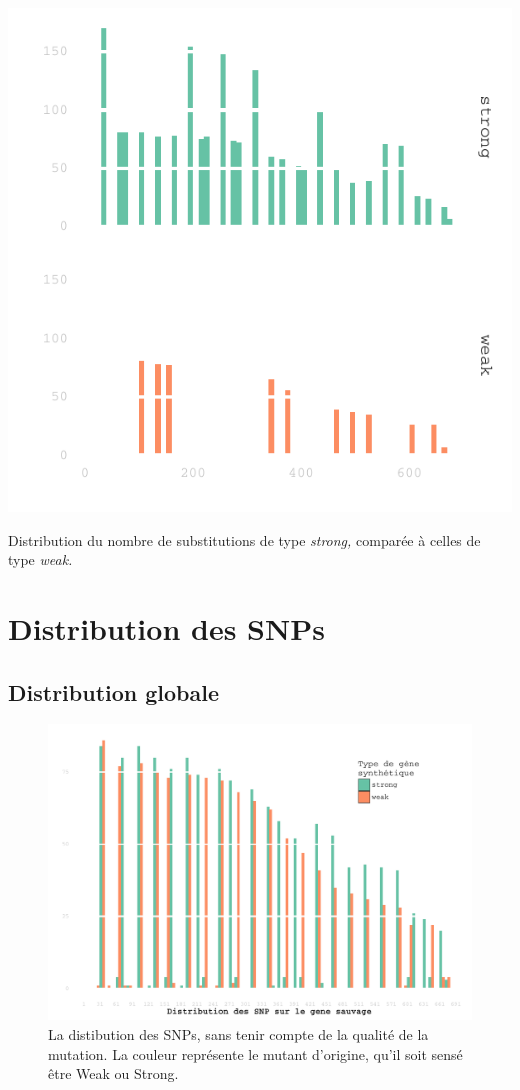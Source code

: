 \documentclass[a4paper]{tufte-handout}
\begin{document}
\begin{marginfigure}
  \includegraphics[width=\linewidth]{../strong_vs_weak.pdf}
  \caption{Distribution du nombre de substitutions de type \emph{strong,} comparée à
    celles de type \emph{weak.} }
\end{marginfigure}

\newpage
\section{Distribution des SNPs}
\label{sec:orgheadline8}
\subsection{Distribution globale}
\label{sec:orgheadline6}
\begin{figure}[h]
  \centering
  \includegraphics[width=\linewidth]{../snp_distribution.pdf}
  \caption{La distibution des SNPs, sans tenir compte de la qualité de la
    mutation. La couleur représente le mutant d'origine, qu'il soit sensé être
    Weak ou Strong.}
  \label{figure1}
\end{figure}
\end{document}
